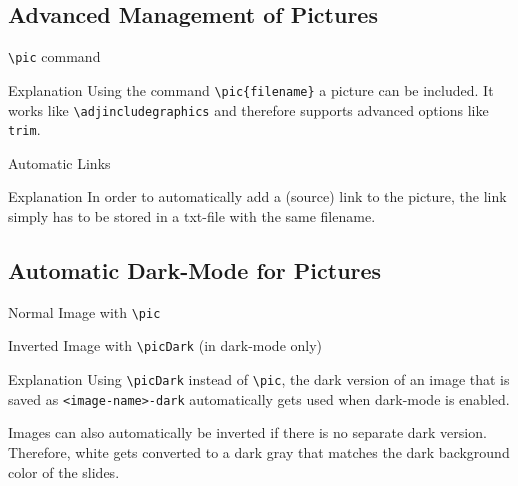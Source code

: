 \documentclass[
	aspectratio=169, %
	8pt, %
]{beamer}
\begin{document}
\subsection{Advanced Management of Pictures}
\begin{frame}{\insertsubsection}
	\begin{mycolumns}[t]
		\begin{example}{\texttt{\textbackslash pic} command}
			\centering{}
		\end{example}
		\begin{note}{Explanation}
			Using the command \texttt{\textbackslash pic\{filename\}} a picture can be included. It works like \texttt{\textbackslash adjincludegraphics} and therefore supports advanced options like \texttt{trim}.
		\end{note}
	\mynextcolumn
		\begin{example}{Automatic Links}
			\centering{} %
		\end{example}
		\begin{note}{Explanation}
			In order to automatically add a (source) link to the picture, the link simply has to be stored in a txt-file with the same filename.
		\end{note}
	\end{mycolumns}
\end{frame}

\subsection{Automatic Dark-Mode for Pictures}
\begin{frame}{\insertsubsection}
	\begin{fancycolumns}
		\begin{notetight}{Normal Image with \texttt{\textbackslash pic}}
			\centering
		\end{notetight}
	\nextcolumn
		\begin{notetight}{Inverted Image with \texttt{\textbackslash picDark} (in dark-mode only)}
			\centering
		\end{notetight}
	\end{fancycolumns}
	\begin{note}{Explanation}
		Using \texttt{\textbackslash picDark} instead of \texttt{\textbackslash pic}, the dark version of an image that is saved as \texttt{<image-name>-dark} automatically gets used when dark-mode is enabled.

		Images can also automatically be inverted if there is no separate dark version. Therefore, white gets converted to a dark gray that matches the dark background color of the slides.
	\end{note}
\end{frame}
\end{document}
